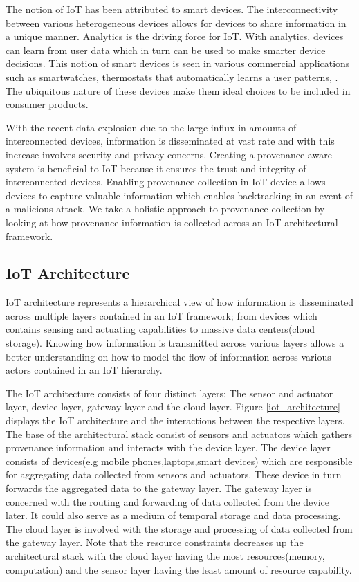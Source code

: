 The notion of IoT has been attributed to smart devices. The interconnectivity between various heterogeneous devices allows for devices to share information in a unique manner. Analytics is the driving force for IoT. With analytics, devices can learn from user data which in turn can be used to make smarter device decisions. This notion of smart devices is seen in various commercial applications such as smartwatches, thermostats that automatically learns a user patterns, . The ubiquitous nature of these devices make them ideal choices to be included in consumer products. 

\par With the recent data explosion \cite{emc_bigdata} due to the large influx in amounts of interconnected devices, information is disseminated at vast rate and with this increase involves security and privacy concerns. Creating a provenance-aware system is beneficial to IoT because it ensures the trust and  integrity of interconnected devices. Enabling provenance collection in IoT device allows devices to capture valuable information which enables backtracking in an event of a malicious attack. We take a holistic approach to provenance collection by looking at how provenance information is collected across an IoT architectural framework.

 
  \subsection{IoT Architecture}

IoT architecture represents a hierarchical view of how information is disseminated across multiple layers contained in an IoT framework; from devices which contains sensing and actuating capabilities to massive data centers(cloud storage). Knowing how information is transmitted across various layers allows a better understanding on how to model the flow of information across various actors contained in an IoT hierarchy. 
\par The IoT architecture consists of four distinct layers: The sensor and actuator layer, device layer, gateway layer and the cloud layer. Figure \ref{iot_architecture} displays the IoT architecture and the interactions between the respective  layers. The base of the architectural stack consist of sensors and actuators which gathers provenance information and interacts with the device layer. The device layer consists of devices(e.g mobile phones,laptops,smart devices) which are responsible for aggregating data collected from sensors and actuators. These device in turn forwards the aggregated data to the gateway layer. The gateway layer is concerned with the routing and forwarding of data collected from the device later. It could also serve as a medium of temporal storage and data processing. The cloud layer is involved with the storage and processing of data collected from the gateway layer. Note that the resource constraints decreases up the architectural stack with the cloud layer having the most resources(memory, computation) and the sensor layer having the least amount of resource capability. 


